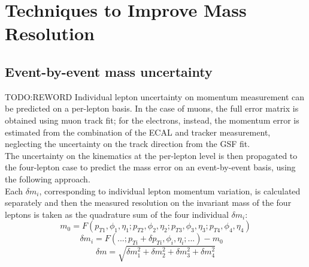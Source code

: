 \section{Techniques to Improve Mass Resolution}
\label{sec:techniques}

\subsection{Event-by-event mass uncertainty}
TODO:REWORD
Individual lepton uncertainty on momentum measurement can be predicted on a per-lepton 
basis. In the case of muons, the full error matrix is obtained using muon track fit; for the electrons,
instead, the momentum error is estimated from the combination of the ECAL and tracker measurement, 
neglecting the uncertainty on the track direction from the GSF fit. \\
The uncertainty on the kinematics at the per-lepton level is then propagated to the four-lepton case 
to predict the mass error on an event-by-event basis, using the following approach.\\
Each $\delta m_{i}$, corresponding to individual lepton momentum variation, is calculated separately 
and then the measured resolution on the invariant mass of the four leptons is taken as the quadrature sum 
of the four individual $\delta m_{i}$:
\[
m_{0} = F(p_{T1}, \phi_{1},\eta_{1}; p_{T2}, \phi_{2},\eta_{2}; p_{T3}, \phi_{3}, \eta_{3}; p_{T4}, \phi_{4},\eta_{4})
\]
\[\delta m_{i} = F(...; p_{Ti} + \delta p_{Ti}, \phi_{i}, \eta_{i}; ...) - m_{0} \quad
\]
\[
\delta m = \sqrt{\delta m_{1}^2 + \delta m_{2}^2 + \delta m_{3}^2 + \delta m_{4}^2}
\]

